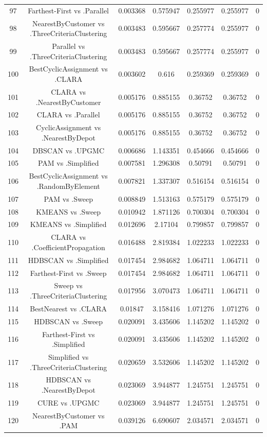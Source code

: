 \documentclass[a4paper,10pt]{article}
\begin{document}
\begin{landscape}
\begin{table}[!htp]
\begin{tabular}{ccccccc}
97&Farthest-First vs .Parallel&0.003368&0.575947&0.255977&0.255977&0\\
98&NearestByCustomer vs .ThreeCriteriaClustering&0.003483&0.595667&0.257774&0.255977&0\\
99&Parallel vs .ThreeCriteriaClustering&0.003483&0.595667&0.257774&0.255977&0\\
100&BestCyclicAssignment vs .CLARA&0.003602&0.616&0.259369&0.259369&0\\
101&CLARA vs .NearestByCustomer&0.005176&0.885155&0.36752&0.36752&0\\
102&CLARA vs .Parallel&0.005176&0.885155&0.36752&0.36752&0\\
103&CyclicAssignment vs .NearestByDepot&0.005176&0.885155&0.36752&0.36752&0\\
104&DBSCAN vs .UPGMC&0.006686&1.143351&0.454666&0.454666&0\\
105&PAM vs .Simplified&0.007581&1.296308&0.50791&0.50791&0\\
106&BestCyclicAssignment vs .RandomByElement&0.007821&1.337307&0.516154&0.516154&0\\
107&PAM vs .Sweep&0.008849&1.513163&0.575179&0.575179&0\\
108&KMEANS vs .Sweep&0.010942&1.871126&0.700304&0.700304&0\\
109&KMEANS vs .Simplified&0.012696&2.17104&0.799857&0.799857&0\\
110&CLARA vs .CoefficientPropagation&0.016488&2.819384&1.022233&1.022233&0\\
111&HDBSCAN vs .Simplified&0.017454&2.984682&1.064711&1.064711&0\\
112&Farthest-First vs .Sweep&0.017454&2.984682&1.064711&1.064711&0\\
113&Sweep vs .ThreeCriteriaClustering&0.017956&3.070473&1.064711&1.064711&0\\
114&BestNearest vs .CLARA&0.01847&3.158416&1.071276&1.071276&0\\
115&HDBSCAN vs .Sweep&0.020091&3.435606&1.145202&1.145202&0\\
116&Farthest-First vs .Simplified&0.020091&3.435606&1.145202&1.145202&0\\
117&Simplified vs .ThreeCriteriaClustering&0.020659&3.532606&1.145202&1.145202&0\\
118&HDBSCAN vs .NearestByDepot&0.023069&3.944877&1.245751&1.245751&0\\
119&CURE vs .UPGMC&0.023069&3.944877&1.245751&1.245751&0\\
120&NearestByCustomer vs .PAM&0.039126&6.690607&2.034571&2.034571&0\\

\end{tabular}
\end{table}
\end{landscape}
\end{document}
